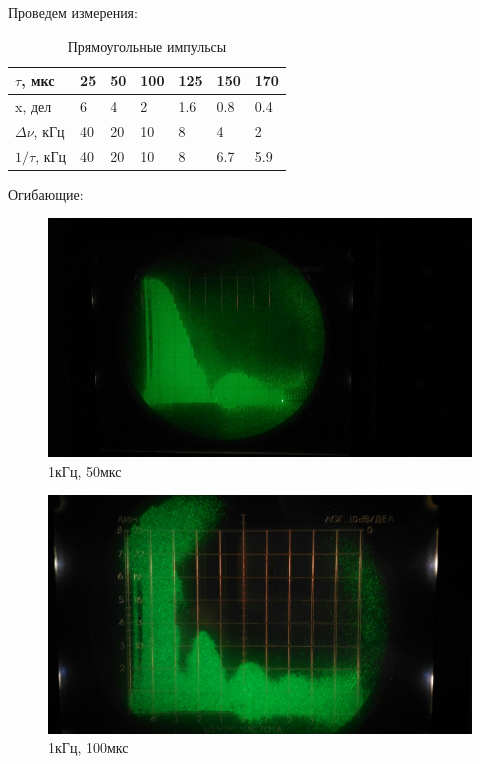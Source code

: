 \documentclass[a4paper,12pt]{article}
\begin{document}
		Проведем измерения:
		
		\begin{table}[h]
			\centering
			\caption{Прямоугольные импульсы}
			\label{my-label}
			\begin{tabular}{|l|l|l|l|l|l|l|}
				\hline
				$\tau$, мкс      & 25 & 50 & 100 & 125 & 150 & 170 \\ \hline
				x, дел          & 6  & 4  & 2   & 1.6 & 0.8 & 0.4 \\ \hline
				$\Delta\nu$, кГц & 40 & 20 & 10  & 8   & 4   & 2   \\ \hline
				$1/\tau$, кГц  & 40 & 20 & 10  & 8   & 6.7 & 5.9 \\ \hline
			\end{tabular}
		\end{table}
		
		Огибающие: 
		
		\begin{figure}[h]
			\begin{minipage}[h]{0.49\linewidth}
				\centering
				\includegraphics[width=0.9\linewidth]{pic4} \\ 1кГц, 50мкс
			\end{minipage}
			\hfill
			\begin{minipage}[h]{0.49\linewidth}
				\centering
				\includegraphics[width=0.9\linewidth]{pic5} \\ 1кГц, 100мкс
			\end{minipage}
			\hfill
		\end{figure}
		
\end{document}
